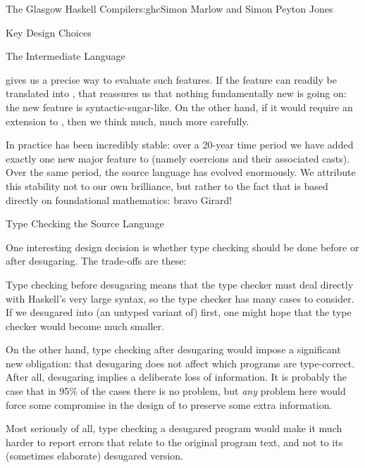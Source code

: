 \begin{aosachapter}{The Glasgow Haskell Compiler}{s:ghc}{Simon Marlow and Simon Peyton Jones}
\begin{aosasect1}{Key Design Choices}
\begin{aosasect2}{The Intermediate Language}
\begin{aosaitemize}
   gives us a precise way to evaluate such features.  If the
  feature can readily be translated into , that reassures us
  that nothing fundamentally new is going on: the new feature is
  syntactic-sugar-like. On the other hand, if it would require an
  extension to , then we think much, much more carefully.

\end{aosaitemize}

In practice  has been incredibly stable: over a 20-year time
period we have added exactly one new major feature to  (namely
coercions and their associated casts).  Over the same period, the
source language has evolved enormously.  We attribute this stability
not to our own brilliance, but rather to the fact that  is
based directly on foundational mathematics: bravo Girard!

\end{aosasect2}

\begin{aosasect2}{Type Checking the Source Language}

One interesting design decision is whether type checking should be
done before or after desugaring.  The trade-offs are these:

\begin{aosaitemize}

\item Type checking before desugaring means that the type checker must
  deal directly with Haskell's very large syntax, so the type checker
  has many cases to consider.  If we desugared into (an untyped
  variant of)  first, one might hope that the type checker
  would become much smaller.

\item On the other hand, type checking after desugaring would impose a
  significant new obligation: that desugaring does not affect which
  programs are type-correct.  After all, desugaring implies a
  deliberate loss of information.  It is probably the case that in
  95\% of the cases there is no problem, but \emph{any} problem here
  would force some compromise in the design of  to preserve
  some extra information.

\item Most seriously of all, type checking a desugared program would
  make it much harder to report errors that relate to the original
  program text, and not to its (sometimes elaborate) desugared
  version.


\end{aosaitemize}
\end{aosasect2}
\end{aosasect1}
\end{aosachapter}
